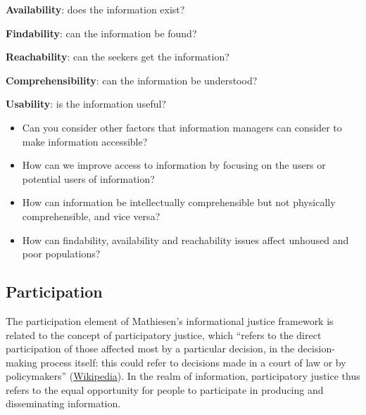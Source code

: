 \documentclass[
  letterpaper,
  DIV=11,
  numbers=noendperiod]{scrreprt}
\providecommand{\tightlist}{%
  \setlength{\itemsep}{0pt}\setlength{\parskip}{0pt}}
\begin{document}
\textbf{Availability}: does the information exist?

\textbf{Findability}: can the information be found?

\textbf{Reachability}: can the seekers get the information?

\textbf{Comprehensibility}: can the information be understood?

\textbf{Usability}: is the information useful?

\begin{tcolorbox}[enhanced jigsaw, arc=.35mm, bottomrule=.15mm, bottomtitle=1mm, breakable, colback=white, colbacktitle=quarto-callout-tip-color!10!white, colframe=quarto-callout-tip-color-frame, coltitle=black, left=2mm, leftrule=.75mm, opacityback=0, opacitybacktitle=0.6, rightrule=.15mm, title=\textcolor{quarto-callout-tip-color}{\faLightbulb}\hspace{0.5em}{Pause and reflect}, titlerule=0mm, toprule=.15mm, toptitle=1mm]

\begin{itemize}
\tightlist
\item
  Can you consider other factors that information managers can consider
  to make information accessible?
\item
  How can we improve access to information by focusing on the users or
  potential users of information?
\item
  How can information be intellectually comprehensible but not
  physically comprehensible, and vice versa?
\item
  How can findability, availability and reachability issues affect
  unhoused and poor populations?
\end{itemize}

\end{tcolorbox}

\subsection{Participation}\label{participation}

The participation element of Mathiesen's informational justice framework
is related to the concept of participatory justice, which ``refers to
the direct participation of those affected most by a particular
decision, in the decision-making process itself: this could refer to
decisions made in a court of law or by policymakers''
(\href{https://en.wikipedia.org/wiki/Participatory_justice}{Wikipedia}).
In the realm of information, participatory justice thus refers to the
equal opportunity for people to participate in producing and
disseminating information.
\end{document}
